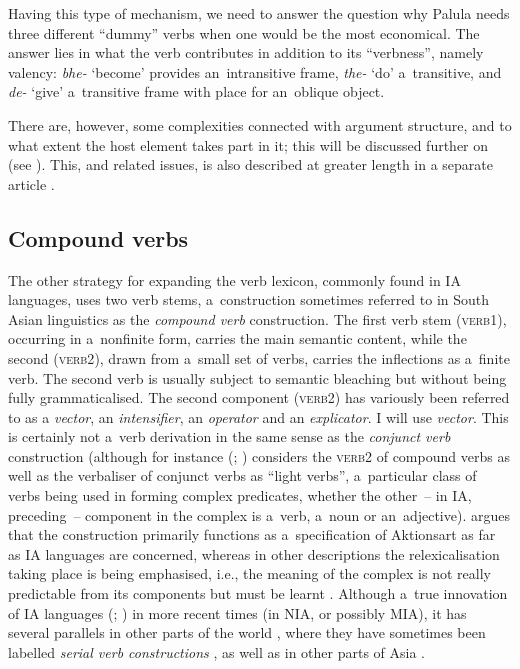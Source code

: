 Having this type of mechanism, we need to answer the question why Palula needs three different ``dummy'' verbs when one would be the most economical. The answer lies in what the verb contributes in addition to its ``verbness'', namely valency: \textit{bhe-} `become' provides an~intransitive frame, \textit{the-} `do' a~transitive, and \textit{de-} `give' a~transitive frame with place for an~oblique object. 


There are, however, some complexities connected with argument structure, and to what extent the host element takes part in it; this will be discussed further on (see ). This, and related issues, is also described at greater length in a separate article \citep{liljegren2010}.


\subsection{Compound verbs}
\label{subsec:8-6-2}

The other strategy for expanding the verb lexicon, commonly found in IA languages, uses two verb stems, a~construction sometimes referred to in South Asian linguistics \citep[326]{masica1991} as the \textit{compound verb} construction. The first verb stem (\textsc{verb1}), occurring in a~nonfinite form, carries the main semantic content, while the second (\textsc{verb2}), drawn from a~small set of verbs, carries the inflections as a~finite verb. The second verb is usually subject to semantic bleaching but without being fully grammaticalised. The second component (\textsc{verb2}) has variously been referred to as a \textit{vector}, an \textit{intensifier}, an \textit{operator} and an \textit{explicator}. I will use \textit{vector}. This is certainly not a~verb derivation in the same sense as the \textit{conjunct verb} construction (although for instance \citeauthor{butt1993} (\citeyear[31]{butt1993}; \citeyear[49]{butt2010}) considers the \textsc{verb2} of compound verbs as well as the verbaliser of conjunct verbs as ``light verbs'', a~particular class of verbs being used in forming complex predicates, whether the other~-- in IA, preceding~-- component in the complex is a~verb, a~noun or an~adjective). \citet[326--330]{masica1991} argues that the construction primarily functions as a~specification of Aktionsart as far as IA languages are concerned, whereas in other descriptions the relexicalisation taking place is being emphasised, i.e., the meaning of the complex is not really predictable from its components but must be learnt \citep[143]{schmidt1999}. Although a~true innovation of IA languages (\citealt[326]{masica1991}; \citealt{hook1977}) in more recent times (in NIA, or possibly MIA), it has several parallels in other parts of the world \citep[348--349]{hook1977}, where they have sometimes been labelled \textit{serial verb constructions} \citep{ansaldo2006}, as well as in other parts of Asia \citep[559]{ebert2006}. 



